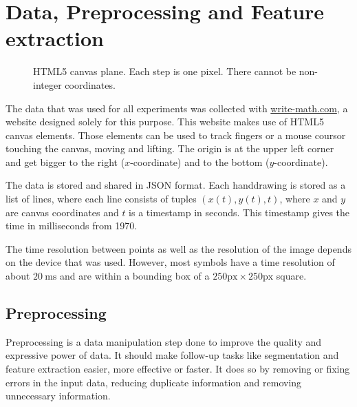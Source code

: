 \chapter{Data, Preprocessing and Feature extraction}\label{ch:preprocessing}

\begin{figure}
  \vspace{-35pt}
  \begin{center}
    
  \end{center}
  \vspace{-20pt}
  \caption{HTML5 canvas plane. Each step is one pixel. There cannot be non-integer
           coordinates.}
  \label{fig:canvas-plane}
  \vspace{-10pt}
\end{figure}

The data that was used for all experiments was collected with
\href{http://write-math.com}{write-math.com}, a website designed solely for
this purpose. This website makes use of HTML5 canvas elements. Those elements
can be used to track fingers or a mouse coursor touching the canvas, moving
and lifting. The origin is at the upper left corner and get bigger to the right
($x$-coordinate) and to the bottom ($y$-coordinate).

The data is stored and shared in JSON format. Each handdrawing is stored as a
list of lines, where each line consists of tuples $(x(t), y(t), t)$, where $x$
and $y$ are canvas coordinates and $t$ is a timestamp in seconds. This timestamp
gives the time in milliseconds from 1970.

The time resolution between points as well as the resolution of the image
depends on the device that was used. However, most symbols have a time
resolution of about $\SI{20}{\milli\second}$ and are within a bounding box of a
$250 \text{px} \times 250 \text{px}$ square.

\section{Preprocessing}\label{sec:preprocessing}
Preprocessing is a data manipulation step done to improve the quality and
expressive power of data. It should make follow-up tasks like segmentation and
feature extraction easier, more effective or faster. It does so by removing
or fixing errors in the input data, reducing duplicate information and
removing unnecessary information.

